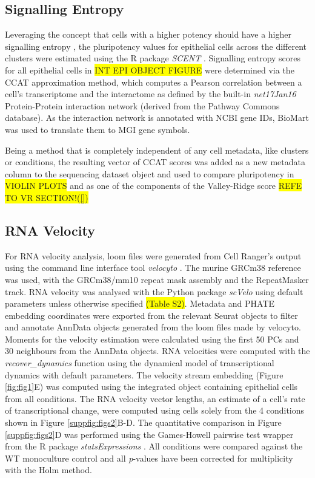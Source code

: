 \subsection*{Signalling Entropy}

Leveraging the concept that cells with a higher potency should have a higher signalling entropy \cite{teschendorff_signalling_2014}, the pluripotency values for epithelial cells across the different clusters were estimated using the R package \textit{SCENT} \cite{teschendorff_singlecell_2017}. 
Signalling entropy scores for all epithelial cells in \colorbox{yellow}{INT EPI OBJECT FIGURE} were determined via the CCAT approximation method, which computes a Pearson correlation between a cell's transcriptome and the interactome as defined by the built-in \textit{net17Jan16} Protein-Protein interaction network (derived from the Pathway Commons database). As the interaction network is annotated with NCBI gene IDs, BioMart was used to translate them to MGI gene symbols.

Being a method that is completely independent of any cell metadata, like clusters or conditions, the resulting vector of CCAT scores was added as a new metadata column to the sequencing dataset object and used to compare pluripotency in \colorbox{yellow}{VIOLIN PLOTS} and as one of the components of the Valley-Ridge score \colorbox{yellow}{REFE TO VR SECTION!(\ref{})}


\subsection*{RNA Velocity}

For RNA velocity analysis, loom files were generated from Cell Ranger's output using the command line interface tool \textit{velocyto} \cite{lamanno_rna_2018}. The murine GRCm38 reference was used, with the GRCm38/mm10 repeat mask assembly and the RepeatMasker track. RNA velocity was analysed with the Python package \textit{scVelo} \cite{bergen_generalizing_2020} using default parameters unless otherwise specified \colorbox{yellow}{(Table S2)}. Metadata and PHATE embedding coordinates were exported from the relevant Seurat objects to filter and annotate AnnData objects generated from the loom files made by velocyto. Moments for the velocity estimation were calculated using the first 50 PCs and 30 neighbours from the AnnData objects. RNA velocities were computed with the \textit{recover\_dynamics} function using the dynamical model of transcriptional dynamics with default parameters. The velocity stream embedding (Figure \ref{fig:fig1}E) was computed using the integrated object containing epithelial cells from all conditions. The RNA velocity vector lengths, an estimate of a cell's rate of transcriptional change, were computed using cells solely from the 4 conditions shown in Figure \ref{suppfig:figs2}B-D. The quantitative comparison in Figure \ref{suppfig:figs2}D was performed using the Games-Howell pairwise test wrapper from the R package \textit{statsExpressions} \cite{patil_statsexpressions_2021}. All conditions were compared against the WT monoculture control and all \textit{p}-values have been corrected for multiplicity with the Holm method.

